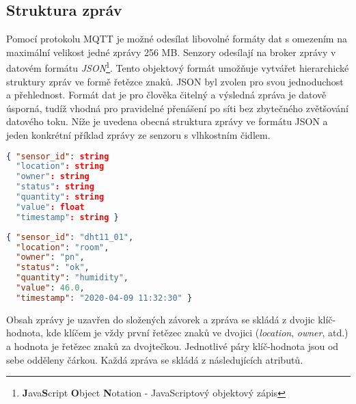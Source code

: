 \subsection{Struktura zpráv} \label{subsec:message_structure}
Pomocí protokolu MQTT je možné odesílat libovolné formáty dat s omezením na maximální velikost jedné zprávy 256 MB. Senzory odesílají na broker zprávy v datovém formátu \textit{JSON}\footnote{\textbf{J}ava\textbf{S}cript \textbf{O}bject \textbf{N}otation - JavaScriptový objektový zápis}. Tento objektový formát umožňuje vytvářet hierarchické struktury zpráv ve formě řetězce znaků. JSON byl zvolen pro svou jednoduchost a přehlednost. Formát dat je pro člověka čitelný a výsledná zpráva je datově úsporná, tudíž vhodná pro pravidelné přenášení po síti bez zbytečného zvětšování datového toku. Níže je uvedena obecná struktura zprávy ve formátu JSON a jeden konkrétní příklad zprávy ze senzoru s vlhkostním čidlem. \\

\begin{lstlisting}[language=json]
{ "sensor_id": string
  "location": string
  "owner": string
  "status": string
  "quantity": string
  "value": float
  "timestamp": string }
\end{lstlisting}
\begin{lstlisting}[language=json]
{ "sensor_id": "dht11_01", 
  "location": "room", 
  "owner": "pn", 
  "status": "ok", 
  "quantity": "humidity", 
  "value": 46.0, 
  "timestamp": "2020-04-09 11:32:30" }
\end{lstlisting}

Obsah zprávy je uzavřen do složených závorek a zpráva se skládá z dvojic klíč-hodnota, kde klíčem je vždy první řetězec znaků ve dvojici (\textit{location}, \textit{owner}, atd.) a hodnota je řetězec znaků za dvojtečkou. Jednotlivé páry klíč-hodnota jsou od sebe odděleny čárkou. Každá zpráva se skládá z následujících atributů.

